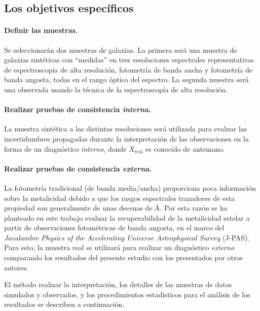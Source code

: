 \subsection{Los objetivos específicos}

\paragraph{Definir las muestras.} Se seleccionarán dos muestras de galaxias. La primera será una
muestra de galaxias sintéticas con ``medidas'' en tres resoluciones espectrales representativas de
espectroscopía de alta resolución, fotometría de banda ancha y fotometría de banda angosta, todas en
el rango óptico del  espectro. La segunda muestra será una observada usando la técnica de la
espectroscopía de alta resolución.

\paragraph{Realizar pruebas de consistencia \emph{interna}.} La muestra sintética a las distintas
resoluciones será utilizada para evaluar las incertidumbres propagadas durante la interpretación de
las observaciones en la forma de un diagnóstico \emph{interno}, donde $X_\text{real}$ es conocido de
antemano.

\paragraph{Realizar pruebas de consistencia \emph{externa}.} La fotometría tradicional (de banda
media/ancha) proporciona poca información sobre la metalicidad debido a que los rasgos espectrales
trazadores de esta propiedad son generalmente de unas decenas de \AA. Por esta razón se ha planteado
en este trabajo evaluar la recuperabilidad de la metalicidad estelar a partir de observaciones
fotométricas de banda angosta, en el marco del \emph{Javalambre Physics of the Accelerating Universe
Astrophysical Survey} (J-PAS). Para esto, la muestra real se utilizará para realizar un diagnóstico
\emph{externo} comparando los resultados del presente estudio con los presentados por otros autores.

El método realizar la interpretación, los detalles de las muestras de datos simulados y observados,
y los procedimientos estadísticos para el análisis de los resultados se describen a continuación.
